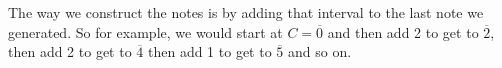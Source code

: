 \documentclass[preview]{standalone}
\begin{document}
\begin{center}
The way we construct the notes is by adding that interval to the last note we generated. So for example, we would start at $C=\overline{0}$ and then add 2 to get to $\overline{2}$, then add 2 to get to $\overline{4}$ then add 1 to get to $\overline{5}$ and so on.
\end{center}
\end{document}
